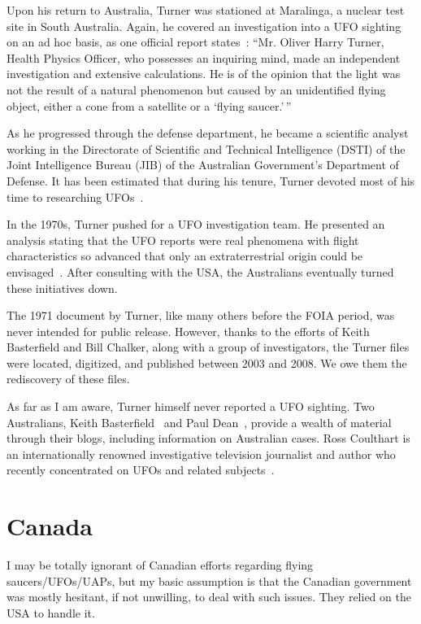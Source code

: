 Upon his return to Australia, Turner was stationed at Maralinga, a nuclear test site in South Australia. Again, he covered an investigation into a UFO sighting on an ad hoc basis, as one official report states~\cite[p.~74]{Turner-WREMa}: ``Mr. Oliver Harry Turner, Health Physics Officer, who possesses an inquiring mind, made an independent investigation and extensive calculations. He is of the opinion that the light was not the result of a natural phenomenon but caused by an unidentified flying object, either a cone from a satellite or a `flying saucer.'\,''

As he progressed through the defense department, he became a scientific analyst working in the Directorate of Scientific and Technical Intelligence (DSTI) of the Joint Intelligence Bureau (JIB) of the Australian Government's Department of Defense. It has been estimated that during his tenure, Turner devoted most of his time to researching UFOs~\cite{Chalker22}.

In the 1970s, Turner pushed for a UFO investigation team. He presented an analysis stating that the UFO reports were real phenomena with flight characteristics so advanced that only an extraterrestrial origin could be envisaged~\cite{TurnerAustralia1971}. After consulting with the USA, the Australians eventually turned these initiatives down.


The 1971 document by Turner, like many others before the FOIA period, was never intended for public release.
However, thanks to the efforts of Keith Basterfield and Bill Chalker, along with a group of investigators, the Turner files were located,
digitized, and published between 2003 and 2008. We owe them the rediscovery of these files.

As far as I am aware, Turner himself never reported a UFO sighting. Two Australians,
Keith Basterfield~\cite{Basterfield-Blog} and Paul Dean~\cite{PaulDean-blog},
provide a wealth of material through their blogs, including information on Australian cases.
Ross Coulthart is an internationally renowned investigative television journalist and author
who recently concentrated on UFOs and related subjects~\cite{Coulthart2021Aug}.


\section{Canada}
\label{2023-UFO-part-Perception-types-Canada}

I may be totally ignorant of Canadian efforts regarding flying saucers/UFOs/UAPs, but my basic assumption is that the Canadian government was mostly hesitant, if not unwilling, to deal with such issues. They relied on the USA to handle it.

